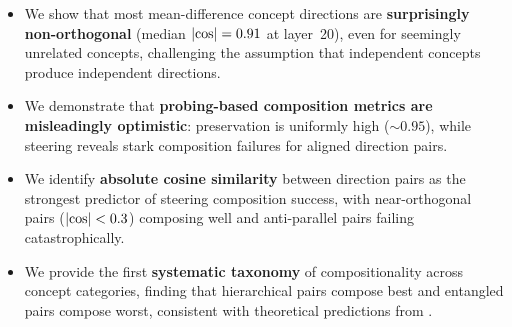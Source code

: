 \begin{itemize}[leftmargin=*,itemsep=0pt,topsep=0pt]
    \item We show that most mean-difference concept directions are
    \textbf{surprisingly non-orthogonal} (median $|\text{cos}| = 0.91$ at
    layer~20), even for seemingly unrelated concepts, challenging the
    assumption that independent concepts produce independent directions.
    \item We demonstrate that \textbf{probing-based composition metrics are
    misleadingly optimistic}: preservation is uniformly high (${\sim}0.95$),
    while steering reveals stark composition failures for aligned direction
    pairs.
    \item We identify \textbf{absolute cosine similarity} between direction
    pairs as the strongest predictor of steering composition success, with
    near-orthogonal pairs ($|\text{cos}| < 0.3$) composing well and
    anti-parallel pairs failing catastrophically.
    \item We provide the first \textbf{systematic taxonomy} of
    compositionality across concept categories, finding that hierarchical
    pairs compose best and entangled pairs compose worst, consistent with
    theoretical predictions from \citet{park2023linear}.
\end{itemize}
